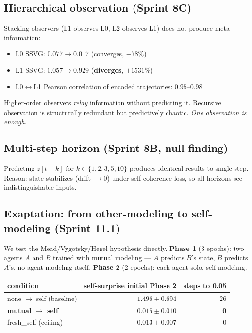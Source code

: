 \documentclass[11pt]{article}
\begin{document}
\subsection{Hierarchical observation (Sprint 8C)}
Stacking observers (L1 observes L0, L2 observes L1) does not produce meta-information:

\begin{itemize}
    \item L0 SSVG: $0.077 \to 0.017$ (converges, $-78\%$)
    \item L1 SSVG: $0.057 \to 0.929$ (\textbf{diverges}, $+1531\%$)
    \item L0$\leftrightarrow$L1 Pearson correlation of encoded trajectories: $0.95$--$0.98$
\end{itemize}

Higher-order observers \emph{relay} information without predicting it. Recursive observation is structurally redundant but predictively chaotic. \emph{One observation is enough.}

\subsection{Multi-step horizon (Sprint 8B, null finding)}
Predicting $z[t{+}k]$ for $k \in \{1, 2, 3, 5, 10\}$ produces identical results to single-step. Reason: state stabilizes (drift $\to 0$) under self-coherence loss, so all horizons see indistinguishable inputs.

\subsection{Exaptation: from other-modeling to self-modeling (Sprint 11.1)}

We test the Mead/Vygotsky/Hegel hypothesis directly. \textbf{Phase 1} (3 epochs): two agents $A$ and $B$ trained with mutual modeling --- $A$ predicts $B$'s state, $B$ predicts $A$'s, no agent modeling itself. \textbf{Phase 2} (2 epochs): each agent solo, self-modeling.

\begin{table}[h]\centering\small
\begin{tabular}{lrr}
\toprule
condition & self-surprise initial Phase 2 & steps to 0.05 \\
\midrule
none $\to$ self (baseline) & $1.496 \pm 0.694$ & 26 \\
\textbf{mutual $\to$ self} & $\mathbf{0.015 \pm 0.010}$ & \textbf{0} \\
fresh\_self (ceiling) & $0.013 \pm 0.007$ & 0 \\
\bottomrule
\end{tabular}
\end{table}
\end{document}
